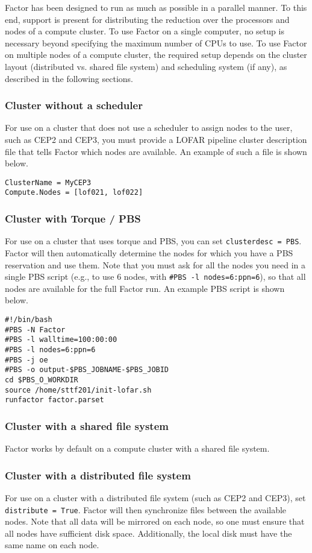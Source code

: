 \documentclass[structabstract]{article}
\begin{document}
Factor has been designed to run as much as possible in a parallel manner. To
this end, support is present for distributing the reduction over the processors
and nodes of a compute cluster. To use Factor on a single computer, no setup is
necessary beyond specifying the maximum number of CPUs to use. To use Factor on
multiple nodes of a compute cluster, the required setup depends on the cluster
layout (distributed vs. shared file system) and scheduling system (if any), as
described in the following sections.

\subsubsection{Cluster without a scheduler}
For use on a cluster that does not use a scheduler to assign nodes to the user, such as CEP2 and CEP3,
you must provide a LOFAR pipeline cluster description file that tells Factor which nodes are
available. An example of such a file is shown below.

\begin{verbatim}
ClusterName = MyCEP3
Compute.Nodes = [lof021, lof022]
\end{verbatim}

\subsubsection{Cluster with Torque / PBS }
For use on a cluster that uses torque and PBS, you can set {\tt clusterdesc =
PBS}. Factor will then automatically determine the nodes for which you have a
PBS reservation and use them. Note that you must ask for all the nodes you need
in a single PBS script (e.g., to use 6 nodes, with {\tt \#PBS -l
nodes=6:ppn=6}), so that all nodes are available for the full Factor run. An
example PBS script is shown below.

\begin{verbatim}
#!/bin/bash
#PBS -N Factor
#PBS -l walltime=100:00:00
#PBS -l nodes=6:ppn=6
#PBS -j oe
#PBS -o output-$PBS_JOBNAME-$PBS_JOBID
cd $PBS_O_WORKDIR
source /home/sttf201/init-lofar.sh
runfactor factor.parset
\end{verbatim}

\subsubsection{Cluster with a shared file system}
Factor works by default on a compute cluster with a shared file system.

\subsubsection{Cluster with a distributed file system}
For use on a cluster with a distributed file system (such as CEP2 and CEP3), set
{\tt distribute = True}. Factor will then synchronize files between the
available nodes. Note that all data will be mirrored on each node, so one must
ensure that all nodes have sufficient disk space. Additionally, the local disk
must have the same name on each node.
\end{document}
